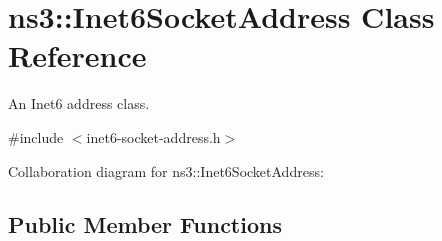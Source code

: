 \hypertarget{classns3_1_1Inet6SocketAddress}{}\section{ns3\+:\+:Inet6\+Socket\+Address Class Reference}
\label{classns3_1_1Inet6SocketAddress}


An Inet6 address class.  




{\ttfamily \#include $<$inet6-\/socket-\/address.\+h$>$}



Collaboration diagram for ns3\+:\+:Inet6\+Socket\+Address\+:
\subsection*{Public Member Functions}
